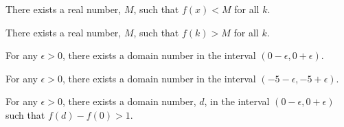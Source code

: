 \documentclass{ximera}
\begin{document}
\begin{exercise}
\begin{question}
There exists a real number, $M$, such that $f(x) < M$ for all $k$.
\begin{multipleChoice}
\end{multipleChoice}

\end{question}





\begin{question} 

There exists a real number, $M$, such that $f(k) > M$ for all $k$.
\begin{multipleChoice}
\end{multipleChoice}

\end{question}








\begin{question} 

For any $\epsilon > 0$, there exists a domain number in the interval $(0-\epsilon, 0+\epsilon)$.
\begin{multipleChoice}
\end{multipleChoice}


\end{question}







\begin{question} 

For any $\epsilon > 0$, there exists a domain number in the interval $(-5-\epsilon, -5+\epsilon)$.
\begin{multipleChoice}
\end{multipleChoice}


\end{question}








\begin{question} 

For any $\epsilon > 0$, there exists a domain number, $d$, in the interval $(0-\epsilon, 0+\epsilon)$ such that $f(d) - f(0) > 1$.
\begin{multipleChoice}
\end{multipleChoice}



\end{question}
\end{exercise}
\end{document}
